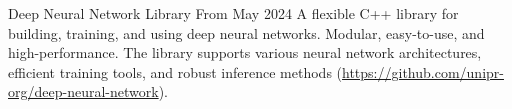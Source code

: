

\begin{cventries}
	\cventrytool
		{Deep Neural Network Library}
		{From May 2024}
		{
			A flexible C++ library for building, training, and using deep neural networks. Modular, easy-to-use, and high-performance. The library supports various neural network architectures, efficient training tools, and robust inference methods (\url{https://github.com/unipr-org/deep-neural-network}).
		}
\end{cventries}
